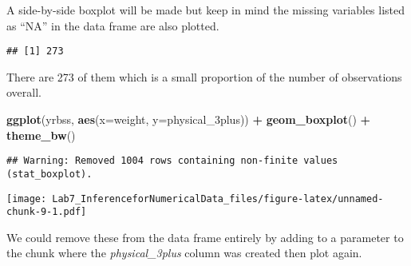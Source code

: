 \documentclass[
]{article}
\newenvironment{Shaded}{\begin{snugshade}}{\end{snugshade}}
\newcommand{\DataTypeTok}[1]{\textcolor[rgb]{0.13,0.29,0.53}{#1}}
\newcommand{\DecValTok}[1]{\textcolor[rgb]{0.00,0.00,0.81}{#1}}
\newcommand{\KeywordTok}[1]{\textcolor[rgb]{0.13,0.29,0.53}{\textbf{#1}}}
\newcommand{\NormalTok}[1]{#1}
\newcommand{\OperatorTok}[1]{\textcolor[rgb]{0.81,0.36,0.00}{\textbf{#1}}}
\newcommand{\StringTok}[1]{\textcolor[rgb]{0.31,0.60,0.02}{#1}}
\begin{document}
A side-by-side boxplot will be made but keep in mind the missing
variables listed as ``NA'' in the data frame are also plotted.

\begin{Shaded}
\end{Shaded}

\begin{verbatim}
## [1] 273
\end{verbatim}

There are 273 of them which is a small proportion of the number of
observations overall.

\begin{Shaded}
\begin{Highlighting}[]
\KeywordTok{ggplot}\NormalTok{(yrbss, }\KeywordTok{aes}\NormalTok{(}\DataTypeTok{x=}\NormalTok{weight, }\DataTypeTok{y=}\NormalTok{physical_3plus)) }\OperatorTok{+}\StringTok{ }\KeywordTok{geom_boxplot}\NormalTok{() }\OperatorTok{+}\StringTok{ }\KeywordTok{theme_bw}\NormalTok{()}
\end{Highlighting}
\end{Shaded}

\begin{verbatim}
## Warning: Removed 1004 rows containing non-finite values (stat_boxplot).
\end{verbatim}

\texttt{[image: Lab7\_InferenceforNumericalData\_files/figure-latex/unnamed-chunk-9-1.pdf]}

We could remove these from the data frame entirely by adding to a
parameter to the chunk where the \emph{physical\_3plus} column was
created then plot again.

\begin{Shaded}
\end{Shaded}
\end{document}
